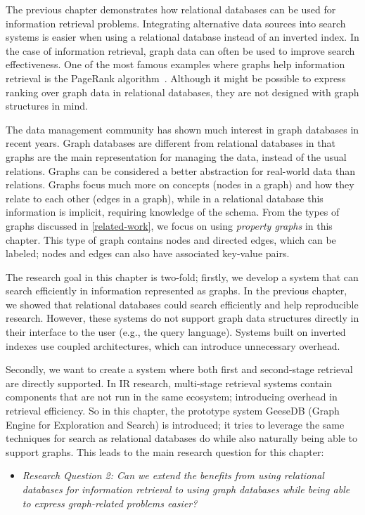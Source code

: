 The previous chapter demonstrates how relational databases can be used for information retrieval problems. Integrating alternative data sources into search systems is easier when using a relational database instead of an inverted index. In the case of information retrieval, graph data can often be used to improve search effectiveness. One of the most famous examples where graphs help information retrieval is the PageRank algorithm~\citep{pagerank}. Although it might be possible to express ranking over graph data in relational databases, they are not designed with graph structures in mind. 

The data management community has shown much interest in graph databases in recent years. Graph databases are different from relational databases in that graphs are the main representation for managing the data, instead of the usual relations. Graphs can be considered a better abstraction for real-world data than relations. Graphs focus much more on concepts (nodes in a graph) and how they relate to each other (edges in a graph), while in a relational database this information is implicit, requiring knowledge of the schema. From the types of graphs discussed in \cref{related-work}, we focus on using \emph{property graphs} in this chapter. This type of graph contains nodes and directed edges, which can be labeled; nodes and edges can also have associated key-value pairs.

The research goal in this chapter is two-fold; firstly, we develop a system that can search efficiently in information represented as graphs. In the previous chapter, we showed that relational databases could search efficiently and help reproducible research. However, these systems do not support graph data structures directly in their interface to the user (e.g., the query language). Systems built on inverted indexes use coupled architectures, which can introduce unnecessary overhead. 

Secondly, we want to create a system where both first and second-stage retrieval are directly supported. In IR research, multi-stage retrieval systems contain components that are not run in the same ecosystem; introducing overhead in retrieval efficiency. 
So in this chapter, the prototype system GeeseDB (Graph Engine for Exploration and Search) is introduced; it tries to leverage the same techniques for search as relational databases do while also naturally being able to support graphs. This leads to the main research question for this chapter:

\begin{itemize}
	\item \emph{Research Question 2: Can we extend the benefits from using relational databases for information retrieval to using graph databases while being able to express graph-related problems easier?} 
\end{itemize} 

